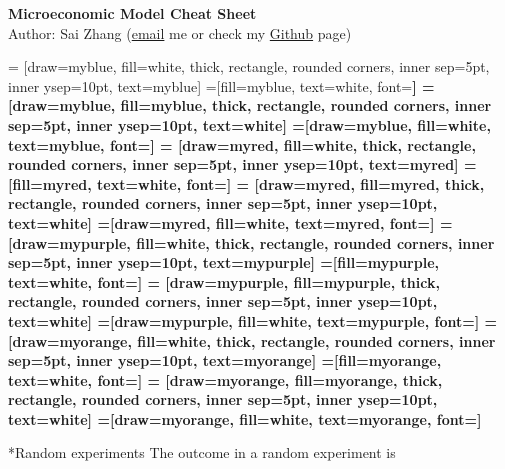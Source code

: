 \documentclass[10pt,landscape,a4paper]{article}
\makeatletter
\renewcommand{\section}{\@startsection{section}{1}{0mm}{1ex}{.2ex}{\normalsize\bfseries}}
\makeatother
\begin{document}
\begin{center}{\large{\textbf{Microeconomic Model Cheat Sheet}}}\\
Author: Sai Zhang (\href{mailto:saizhang.econ@gmail.com}{email} me or check my \href{https://github.com/SaiChrisZHANG}{Github} page)
\end{center}

\small
\begin{multicols*}{4}

 = [draw=myblue, fill=white, thick, rectangle, rounded corners, inner sep=5pt, inner ysep=10pt, text=myblue]
 =[fill=myblue, text=white, font=\bfseries]
 = [draw=myblue, fill=myblue, thick, rectangle, rounded corners, inner sep=5pt, inner ysep=10pt, text=white]
 =[draw=myblue, fill=white, text=myblue, font=\bfseries]
 = [draw=myred, fill=white, thick, rectangle, rounded corners, inner sep=5pt, inner ysep=10pt, text=myred]
 =[fill=myred, text=white, font=\bfseries]
 = [draw=myred, fill=myred, thick, rectangle, rounded corners, inner sep=5pt, inner ysep=10pt, text=white]
 =[draw=myred, fill=white, text=myred, font=\bfseries]
 = [draw=mypurple, fill=white, thick, rectangle, rounded corners, inner sep=5pt, inner ysep=10pt, text=mypurple]
 =[fill=mypurple, text=white, font=\bfseries]
 = [draw=mypurple, fill=mypurple, thick, rectangle, rounded corners, inner sep=5pt, inner ysep=10pt, text=white]
 =[draw=mypurple, fill=white, text=mypurple, font=\bfseries]
 = [draw=myorange, fill=white, thick, rectangle, rounded corners, inner sep=5pt, inner ysep=10pt, text=myorange]
 =[fill=myorange, text=white, font=\bfseries]
 = [draw=myorange, fill=myorange, thick, rectangle, rounded corners, inner sep=5pt, inner ysep=10pt, text=white]
 =[draw=myorange, fill=white, text=myorange, font=\bfseries]

\section*{Random experiments}
The outcome in a random experiment is 

\end{multicols*}
\end{document}
